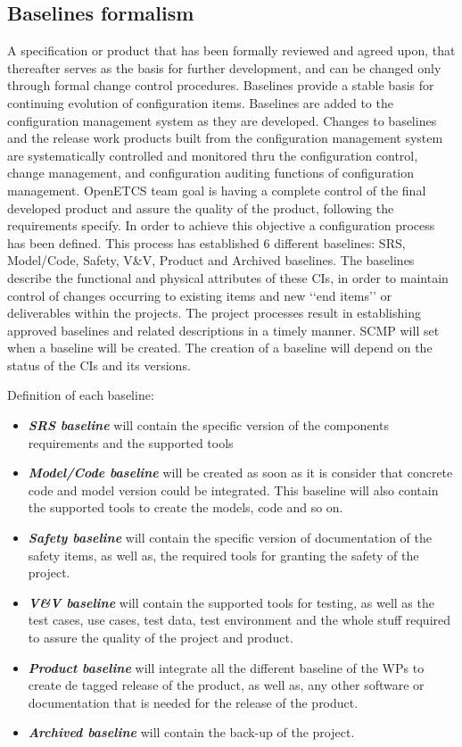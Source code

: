 \documentclass{template/openetcs_article}
\begin{document}
\subsection{Baselines formalism}
A specification or product that has been formally reviewed and agreed upon, that thereafter serves as the basis for further  development, and can be changed only through formal change control procedures. Baselines provide a stable basis for  continuing evolution of configuration items. Baselines are added to the configuration management system as they are  developed. Changes to baselines and the release work products built from the configuration management system are  systematically controlled and monitored thru the configuration control, change management, and configuration auditing  functions of configuration management. 
OpenETCS team goal is having a complete control of the final developed product and assure the quality of the product,  following the requirements specify. In order to achieve this objective a configuration process has been defined. This process  has established 6 different baselines: SRS, Model/Code, Safety, V\&V, Product and Archived baselines. The baselines describe  the functional and physical attributes of these CIs, in order to maintain control of changes occurring to existing items and new  ‘‘end items’’ or deliverables within the projects. The project processes result in establishing approved baselines and related  descriptions in a timely manner. 
SCMP will set when a baseline will be created. The creation of a baseline will depend on the status of the CIs and its versions.

Definition of each baseline:

\vspace{-10pt}
\begin{itemize}
\item \textbf{\textit{SRS baseline}} will contain the specific version of the components requirements and the supported tools
\item \textbf{\textit{Model/Code baseline}} will be created as soon as it is consider that concrete code and model version could be integrated.  This baseline will also contain the supported tools to create the models, code and so on.
\item \textbf{\textit{Safety baseline}} will contain the specific version of documentation of the safety items, as well as, the required tools for granting the safety of the project.
\item \textbf{\textit{V\&V baseline}} will contain the supported tools for testing, as well as the test cases, use cases, test data, test environment and the whole stuff required to assure the quality of the project and product.
\item \textbf{\textit{Product baseline}} will integrate all the different baseline of the WPs to create de tagged release of the product, as well as, any other software or documentation that is needed for the release of the product.
\item \textbf{\textit{Archived baseline}} will contain the back-up of the project.
\end{itemize}
\end{document}

